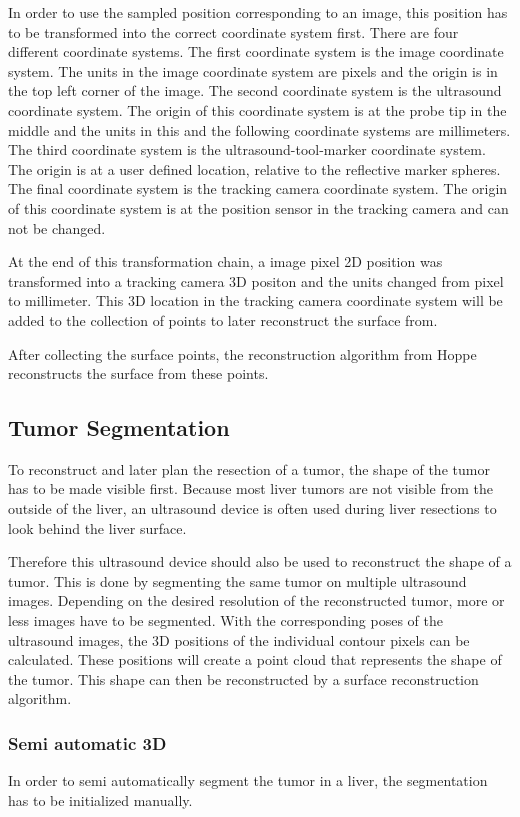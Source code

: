 In order to use the sampled position corresponding to an image, this
position has to be transformed into the correct coordinate system first. There
are four different coordinate systems. The first coordinate system is the image
coordinate system. The units in the image coordinate system are pixels and the
origin is in the top left corner of the image. The
second coordinate system is the ultrasound coordinate system. The origin of this
coordinate system is at the probe tip in the middle and the units in this and
the following coordinate systems are millimeters. The third coordinate system is the
ultrasound-tool-marker coordinate system. The origin is at a user defined
location, relative to the reflective marker spheres. The final
coordinate system is the tracking camera coordinate system. The origin of this
coordinate system is at the position sensor in the tracking camera and can not
be changed.

At the end of this transformation chain, a image pixel 2D position was
transformed into a tracking camera 3D positon and the units changed
from pixel to millimeter. This 3D location in the tracking camera coordinate system
will be added to the collection of points to later reconstruct the surface from.

After collecting the surface points, the reconstruction algorithm from Hoppe
\cite{hoppe1992surface} reconstructs the surface from these points.
\subsection{Tumor Segmentation}
To reconstruct and later plan the resection of a tumor, the shape
of the tumor has to be made visible first. Because most liver tumors are not visible from the outside of the liver, an
ultrasound device is often used during liver resections to look behind the
liver surface.

Therefore this ultrasound device should also be used to
reconstruct the shape of a tumor. This is done by segmenting the same tumor on
multiple ultrasound images. Depending on the desired resolution of the
reconstructed tumor, more or less images have to be segmented. With the corresponding
poses of the ultrasound images, the 3D positions of the individual contour
pixels can be calculated. These positions will create a point cloud that
represents the shape of the tumor. This shape can then be reconstructed by a
surface reconstruction algorithm.
\subsubsection{Semi automatic 3D}
In order to semi automatically segment the tumor in a liver, the segmentation
has to be initialized manually. 
